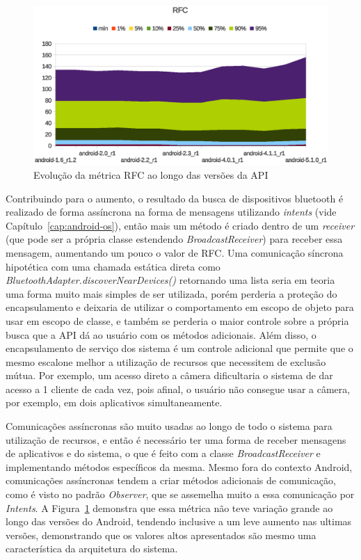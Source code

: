 \begin{figure}[!htb]
\centering
\includegraphics [keepaspectratio=true,scale=0.85]{figuras/graphs/rfc_android.eps}
\caption{Evolução da métrica RFC ao longo das versões da API}
\label{fig:rfc_android}
\end{figure}

Contribuindo para o aumento, o resultado da busca de dispositivos bluetooth é realizado de forma assíncrona na forma de mensagens utilizando \textit{intents} (vide Capítulo~\ref{cap:android-os}), então mais um método é criado dentro de um \textit{receiver} (que pode ser a própria classe estendendo \textit{BroadcastReceiver}) para receber essa mensagem, aumentando um pouco o valor de RFC. Uma comunicação síncrona hipotética com uma chamada estática direta como \textit{BluetoothAdapter.discoverNearDevices()} retornando uma lista seria em teoria uma forma muito mais simples de ser utilizada, porém perderia a proteção do encapsulamento e deixaria de utilizar o comportamento em escopo de objeto para usar em escopo de classe, e também se perderia o maior controle sobre a própria busca que a API dá ao usuário com os métodos adicionais. Além disso, o encapsulamento de serviço dos sistema é um controle adicional que permite que o mesmo escalone melhor a utilização de recursos que necessitem de exclusão mútua. Por exemplo, um acesso direto a câmera dificultaria o sistema de dar acesso a 1 cliente de cada vez, pois afinal, o usuário não consegue usar a câmera, por exemplo, em dois aplicativos simultaneamente.

Comunicações assíncronas são muito usadas ao longo de todo o sistema para utilização de recursos, e então é necessário ter uma forma de receber mensagens de aplicativos e do sistema, o que é feito com a classe \textit{BroadcastReceiver} e implementando métodos específicos da mesma. Mesmo fora do contexto Android, comunicações assíncronas tendem a criar métodos adicionais de comunicação, como é visto no padrão \textit{Observer}, que se assemelha muito a essa comunicação por \textit{Intents}. A Figura~\ref{fig:rfc_android} demonstra que essa métrica não teve variação grande ao longo das versões do Android, tendendo inclusive a um leve aumento nas ultimas versões, demonstrando que os valores altos apresentados são mesmo uma característica da arquitetura do sistema. 


